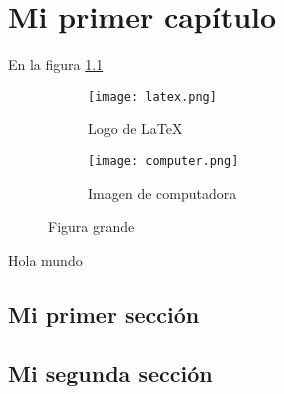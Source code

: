 \documentclass[12pt]{report}
\begin{document}
	\maketitle
	\tableofcontents
	
	\chapter{Mi primer capítulo}
		
		En la figura \ref{fig:latex-logo}
		\lipsum[1][1-11]
	
		\begin{figure}[h]
			\centering
			\begin{subfigure}{0.4\textwidth}
				\centering
				\texttt{[image: latex.png]}
				\caption{Logo de \LaTeX}
				\label{fig:latex-logo}
			\end{subfigure}
			\hfill
			\begin{subfigure}{0.4\textwidth}
				\centering
				\texttt{[image: computer.png]}
				\caption{Imagen de computadora}
				\label{fig:computer-image}
			\end{subfigure}
			\caption{Figura grande}
			\label{fig:grande}
		\end{figure}
		
		Hola \hfill mundo
		
		\section{Mi primer sección}
			\lipsum[1-2]
			\lipsum[1][1-3]
		
		\section{Mi segunda sección}
			\lipsum[3-5]
\end{document}
